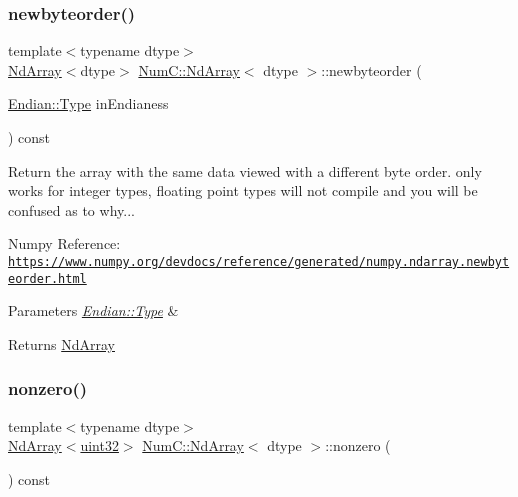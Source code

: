 \subsubsection{\texorpdfstring{newbyteorder()}{newbyteorder()}}
{\footnotesize\ttfamily template$<$typename dtype$>$ \\
\mbox{\hyperlink{class_num_c_1_1_nd_array}{Nd\+Array}}$<$dtype$>$ \mbox{\hyperlink{class_num_c_1_1_nd_array}{Num\+C\+::\+Nd\+Array}}$<$ dtype $>$\+::newbyteorder (\begin{DoxyParamCaption}\item[{\mbox{\hyperlink{struct_num_c_1_1_endian_ab667001489f67f8a96f328f0a9c351fa}{Endian\+::\+Type}}}]{in\+Endianess }\end{DoxyParamCaption}) const\hspace{0.3cm}{\ttfamily [inline]}}

Return the array with the same data viewed with a different byte order. only works for integer types, floating point types will not compile and you will be confused as to why...

Numpy Reference\+: \href{https://www.numpy.org/devdocs/reference/generated/numpy.ndarray.newbyteorder.html}{\tt https\+://www.\+numpy.\+org/devdocs/reference/generated/numpy.\+ndarray.\+newbyteorder.\+html}


\begin{DoxyParams}{Parameters}
{\em \mbox{\hyperlink{struct_num_c_1_1_endian_ab667001489f67f8a96f328f0a9c351fa}{Endian\+::\+Type}}} & \\
\hline
\end{DoxyParams}
\begin{DoxyReturn}{Returns}
\mbox{\hyperlink{class_num_c_1_1_nd_array}{Nd\+Array}} 
\end{DoxyReturn}
\mbox{\label{class_num_c_1_1_nd_array_aa0a3b09f956b37105f51728f43fedc75}} 
\subsubsection{\texorpdfstring{nonzero()}{nonzero()}}
{\footnotesize\ttfamily template$<$typename dtype$>$ \\
\mbox{\hyperlink{class_num_c_1_1_nd_array}{Nd\+Array}}$<$\mbox{\hyperlink{namespace_num_c_ae685802ca6d3035f2b400b081e3953fa}{uint32}}$>$ \mbox{\hyperlink{class_num_c_1_1_nd_array}{Num\+C\+::\+Nd\+Array}}$<$ dtype $>$\+::nonzero (\begin{DoxyParamCaption}{ }\end{DoxyParamCaption}) const\hspace{0.3cm}{\ttfamily [inline]}}

